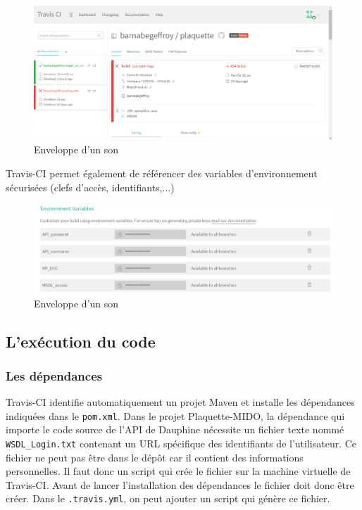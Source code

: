 \begin{figure}[!h]
    \begin{center}
    \includegraphics[width=13cm]{assets/travis-ci.PNG}
    \end{center}
    \caption{Enveloppe d'un son}
\end{figure}


Travis-CI permet également de référencer des variables d'environnement sécurisées (clefs d'accès, identifiants,...)
\begin{figure}[!h]
    \begin{center}
    \includegraphics[width=13cm]{assets/env.PNG}
    \end{center}
    \caption{Enveloppe d'un son}
\end{figure}

\subsection{L'exécution du code}
\subsubsection*{Les dépendances}



Travis-CI identifie automatiquement un projet Maven et installe les dépendances indiquées dans le \texttt{pom.xml}. Dans le projet Plaquette-MIDO, la dépendance qui importe le code source de l'API de Dauphine nécessite un fichier texte nommé \texttt{WSDL\_Login.txt} contenant un URL spécifique des identifiants de l'utilisateur. Ce fichier ne peut pas être dans le dépôt car il contient des informations personnelles. Il faut donc un script qui crée le fichier sur la machine virtuelle de Travis-CI. Avant de lancer l'installation des dépendances le fichier doit donc être créer. Dans le \texttt{.travis.yml}, on peut ajouter un script qui génère ce fichier.

